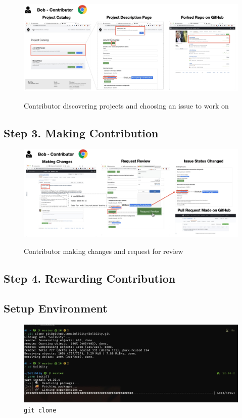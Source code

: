 \documentclass[12pt]{article}
\renewcommand{\_}{\kern-1.5pt\textunderscore\kern-1.5pt}
\begin{document}
\begin{figure}[H]
	\centering
	\includegraphics[width=16.5cm]{graphs/52. discover_1.png}\\
	\caption{Contributor discovering projects and choosing an issue to work on}
	\label{fig:discover1}
\end{figure}


\subsection*{Step 3. Making Contribution}
\begin{figure}[H]
	\centering
	\includegraphics[width=16.5cm]{graphs/53. contribute_1.png}\\
	\caption{Contributor making changes and request for review}
	\label{fig:contribute1}
\end{figure}

\subsection*{Step 4. Rewarding Contribution}


\subsection{Setup Environment}


\begin{figure}[H]
	\centering
	\includegraphics[width=13cm]{graphs/01. git_clone}
	\caption{\texttt{git clone}}
\end{figure}
\end{document}
